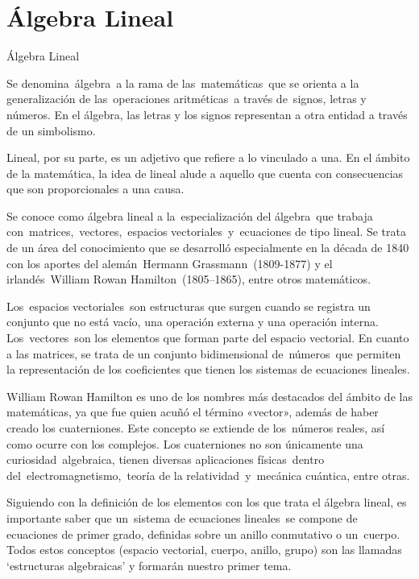 \part{Álgebra Lineal}

\begin{myexampleblock}{Álgebra Lineal}



\vspace{2mm}  Se denomina álgebra a la rama de las matemáticas que se orienta a la generalización de las operaciones aritméticas a través de signos, letras y números. En el álgebra, las letras y los signos representan a otra entidad a través de un simbolismo.

\vspace{2mm} Lineal, por su parte, es un adjetivo que refiere a lo vinculado a una. En el ámbito de la matemática, la idea de lineal alude a aquello que cuenta con consecuencias que son proporcionales a una causa.

\vspace{2mm} Se conoce como álgebra lineal a la especialización del álgebra que trabaja con matrices, vectores, espacios vectoriales y ecuaciones de tipo lineal. Se trata de un área del conocimiento que se desarrolló especialmente en la década de 1840 con los aportes del alemán Hermann Grassmann (1809-1877) y el irlandés William Rowan Hamilton (1805–1865), entre otros matemáticos.

\vspace{2mm} Los espacios vectoriales son estructuras que surgen cuando se registra un conjunto que no está vacío, una operación externa y una operación interna. Los vectores son los elementos que forman parte del espacio vectorial. En cuanto a las matrices, se trata de un conjunto bidimensional de números que permiten la representación de los coeficientes que tienen los sistemas de ecuaciones lineales.

\vspace{2mm} William Rowan Hamilton es uno de los nombres más destacados del ámbito de las matemáticas, ya que fue quien acuñó el término «vector», además de haber creado los cuaterniones. Este concepto se extiende de los números reales, así como ocurre con los complejos. Los cuaterniones no son únicamente una curiosidad algebraica, tienen diversas aplicaciones físicas dentro del electromagnetismo, teoría de la relatividad y mecánica cuántica, entre otras.


\vspace{2mm} Siguiendo con la definición de los elementos con los que trata el álgebra lineal, es importante saber que un sistema de ecuaciones lineales se compone de ecuaciones de primer grado, definidas sobre un anillo conmutativo o un cuerpo. Todos estos conceptos (espacio vectorial, cuerpo, anillo, grupo) son las llamadas `estructuras algebraicas’ y formarán nuestro primer tema.


\end{myexampleblock}
